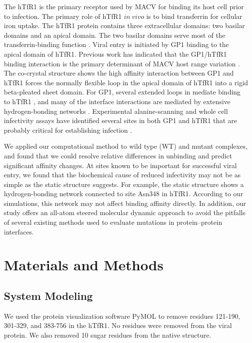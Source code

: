 \documentclass[12pt]{article}
\begin{document}
The hTfR1 is the primary receptor used by MACV for binding its host cell prior to infection. The primary role of hTfR1 $in~vivo$ is to bind transferrin for cellular iron uptake. The hTfR1 protein contains three extracellular domains: two basilar domains and an apical domain. The two basilar domains serve most of the transferrin-binding function \citep{Abraham2010,Rad20112}. Viral entry is initiated by GP1 binding to the apical domain of hTfR1. Previous work has indicated that the GP1/hTfR1 binding interaction is the primary determinant of MACV host range variation \citep{Rad20111,Rad20112}. The co-crystal structure shows the high affinity interaction between GP1 and hTfR1 forces the normally flexible loop in the apical domain of hTfR1 into a rigid beta-pleated sheet domain. For GP1, several extended loops in mediate binding to hTfR1 \citep{Abraham2010,Rad20112}, and many of the interface interactions are mediated by extensive hydrogen-bonding networks \citep{Abraham2010}. Experimental alanine-scanning and whole cell infectivity assays have identified several sites in both GP1 and hTfR1 that are probably critical for establishing infection \citep{Rad20111,Rad20112}.

We applied our computational method to wild type (WT) and mutant complexes, and found that we could resolve relative differences in unbinding and predict significant affinity changes. At sites known to be important for successful viral entry, we found that the biochemical cause of reduced infectivity may not be as simple as the static structure suggests. For example, the static structure shows a hydrogen-bonding network connected to site Asn348 in hTfR1. According to our simulations, this network may not affect binding affinity directly. In addition, our study offers an all-atom steered molecular dynamic approach to avoid the pitfalls of several existing methods used to evaluate mutations in protein--protein interfaces.

\section*{Materials and Methods}

\subsection*{System Modeling}

We used the protein visualization software PyMOL \citep{PyMOL} to remove residues 121-190, 301-329, and 383-756 in the hTfR1. No residues were removed from the viral protein. We also removed 10 sugar residues from the native structure.
\end{document}
